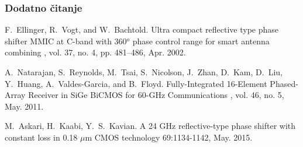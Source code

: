 \documentclass{beamer}
\begin{document}
\begin{frame}[allowframebreaks]
  \frametitle<presentation>{Dodatno čitanje}
    
  \begin{thebibliography}{10}
    

  \beamertemplatearticlebibitems

    F.~Ellinger, R.~Vogt, and W.~Bachtold.
    \newblock Ultra compact reflective type phase shifter MMIC at C-band with 360$^o$ phase control range for smart antenna combining
    , vol. 37, no. 4, pp. 481–486,
    Apr. 2002.
 
    
  \beamertemplatearticlebibitems

    A.~Natarajan, S.~Reynolds, M.~Tsai, S.~Nicolson, J.~Zhan, D.~Kam, D.~Liu, Y.~Huang, A.~Valdes-Garcia, and B.~Floyd.
    \newblock Fully-Integrated 16-Element Phased-Array Receiver in SiGe BiCMOS for 60-GHz Communications
    , vol. 46, no. 5,
    May. 2011.


  \beamertemplatearticlebibitems

    M.~Askari, H.~Kaabi, Y.~S.~Kavian.
    \newblock A 24 GHz reflective-type phase shifter with constant loss in 0.18 $\mu$m CMOS technology
     69:1134-1142,
    May. 2015. %
  \end{thebibliography}
\end{frame}
\end{document}

